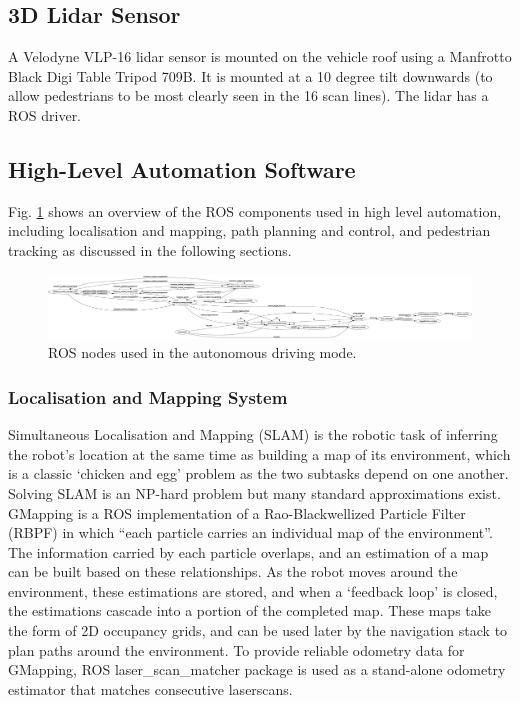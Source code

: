 \documentclass[a4paper]{article}
\begin{document}
	\subsection{3D Lidar Sensor}
	A Velodyne VLP-16 lidar sensor is mounted on the vehicle roof using a Manfrotto Black Digi Table Tripod 709B. It is mounted at a 10 degree tilt downwards (to allow pedestrians to be most clearly seen in the 16 scan lines). The lidar has a ROS driver. 
	
	\subsection{High-Level Automation Software}
	
	Fig. \ref{fig:rosnode_autonomous} shows an overview of the ROS components used in high level automation, including localisation and mapping, path planning and control, and pedestrian tracking as discussed in the following sections.
	\begin{figure}[h]
		\includegraphics[width=\columnwidth]{software/rosnodes_autonomous.png}
		\caption{ROS nodes used in the autonomous driving mode.}
		\label{fig:rosnode_autonomous}
	\end{figure}
	
	\subsubsection{Localisation and Mapping System}
	
	Simultaneous Localisation and Mapping (SLAM) \cite{thrun2002probabilistic} is the robotic task of inferring the robot’s location at the same time as building a map of its environment, which is a classic `chicken and egg’ problem as the two subtasks depend on one another. Solving SLAM is an NP-hard problem but many standard approximations exist. GMapping \cite{yuen2017improved} is a ROS implementation of a Rao-Blackwellized Particle Filter (RBPF) in which ``each particle carries an individual map of the environment''. The information carried by each particle overlaps, and an estimation of a map can be built based on these relationships. As the robot moves around the environment, these estimations are stored, and when a ‘feedback loop’ is closed, the estimations cascade into a portion of the completed map. These maps take the form of 2D occupancy grids, and can be used later by the navigation stack to plan paths around the environment.  To provide reliable odometry data for GMapping, ROS laser\_scan\_matcher package is used  as a stand-alone odometry estimator that matches consecutive laserscans.
	
\end{document}
